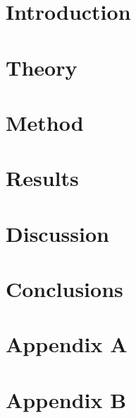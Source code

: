 \documentclass[a4paper, 12pt]{book} %
\begin{document}
\mainmatter %

\chapter{Introduction} %
\label{sec:introduction} %
\cleardoublepage %

\chapter{Theory}
\label{sec:theory}

\cleardoublepage

\chapter{Method}
\label{sec:method}

\cleardoublepage

\chapter{Results}
\label{sec:results}

\cleardoublepage

\chapter{Discussion}
\label{sec:discussion}

\cleardoublepage

\chapter{Conclusions}
\label{sec:conclusions}

\cleardoublepage



\appendix %
\chapter*{Appendix A} %
\label{sec:appendixa} %
\clearpage %

\chapter*{Appendix B}
\label{sec:appendixb}
%
\clearpage
\end{document}
